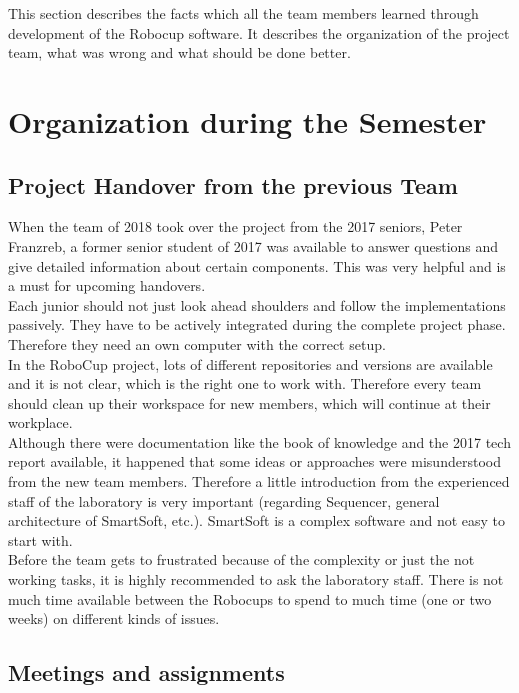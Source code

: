 This section describes the facts which all the team members learned through development of the Robocup software. It describes the organization of the
project team, what was wrong and what should be done better.

\section{Organization during the Semester}

\subsection{Project Handover from the previous Team}

When the team of 2018 took over the project from the 2017 seniors, Peter Franzreb, a former senior student of 2017 was available to answer questions and give detailed information about certain components. This was very helpful and is a must for upcoming handovers. \\

Each junior should not just look ahead shoulders and follow the implementations passively. They have to be actively integrated during the complete project phase. Therefore they need an own computer with the correct setup. \\

In the RoboCup project, lots of different repositories and versions are available and it is not clear, which is the right one to work with. Therefore every team should clean up their workspace for new members, which will continue at their workplace. \\

 Although there were documentation like the book of knowledge \cite{BOK} and the 2017 tech report available, it happened that some ideas or approaches were misunderstood from the new team members. Therefore a little introduction from the experienced staff of the laboratory is very important (regarding Sequencer, general architecture of SmartSoft, etc.). SmartSoft is a complex software and not easy to start with.\\

 Before the team gets to frustrated because of the complexity or just the not working tasks, it is highly recommended to ask the laboratory staff. There is not much time available between the Robocups to spend to much time (one or two weeks) on different kinds of issues.

\subsection{Meetings and assignments}

